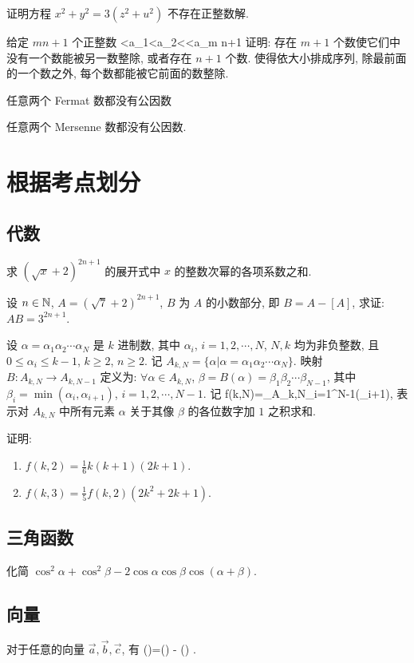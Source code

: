 \bq{}{}
证明方程 $x^2+y^2=3(z^2+u^2)$ 不存在正整数解.
\eq

\bq{}{}
给定 $m n+1$ 个正整数
<a_1<a_2<\cdots<a_{m n+1}
\eee
证明: 存在 $m+1$ 个数使它们中没有一个数能被另一数整除, 或者存在 $n+1$ 个数. 使得依大小排成序列, 除最前面的一个数之外, 每个数都能被它前面的数整除.
\eq

任意两个 Fermat 数都没有公因数
\eq

\bq{}{}
任意两个 Mersenne 数都没有公因数.
\eq

\section{根据考点划分}
\subsection{代数}
求 $(\sqrt{x}+2)^{2n+1}$ 的展开式中 $x$ 的整数次幂的各项系数之和.
\eq

设 $n\in\mathbb{N}$, $A=(\sqrt{7}+2)^{2n+1}$, $B$ 为 $A$ 的小数部分, 即 $B=A-[A]$, 求证: $AB=3^{2n+1}$.
\eq

设 $\alpha=\alpha_1\alpha_2\cdots\alpha_N$ 是 $k$ 进制数, 
其中 $\alpha_i$, $i=1,2,\cdots, N$, $N,k$ 均为非负整数, 
且 $0\le \alpha_i\le k-1$, $k\ge 2$, $n\ge 2$. 
记 $A_{k,N}=\{\alpha|\alpha=\alpha_1\alpha_2\cdots\alpha_N\}$. 
映射 $B: A_{k,N}\to A_{k,N-1}$ 定义为: $\forall \alpha\in A_{k,N}$, 
$\beta=B(\alpha)=\beta_1\beta_2\cdots\beta_{N-1}$, 其中
$\beta_i=\min(\alpha_i,\alpha_{i+1})$, $i=1,2,\cdots,N-1$. 
记
\bee
f(k,N)=\sum_{{\alpha\in A_{k,N}}}\prod_{i=1}^{N-1}(\beta_i+1),
\eee
表示对 $A_{k,N}$ 中所有元素 $\alpha$ 关于其像 $\beta$ 的各位数字加 $1$ 
之积求和.

证明:
\begin{enumerate}
	\item $f(k,2)=\frac16k(k+1)(2k+1)$.
	\item $f(k,3)=\frac15f(k,2)(2k^2+2k+1)$.
\end{enumerate}
\eq

\subsection{三角函数}

化简 $\cos^2\alpha+\cos^2\beta-2\cos\alpha\cos\beta\cos(\alpha+\beta)$.
\eq

\subsection{向量}
对于任意的向量 $\vec{a},\vec{b},\vec{c}$, 有
\bee
(\times{})\times{}=(\cdot {})  - (\cdot{}) .
\eee
\eq

